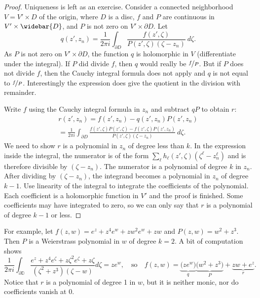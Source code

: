 \documentclass[12pt,openany]{book}
\newcommand{\D}{{\mathbb{D}}}
\theoremstyle{plain}
\theoremstyle{remark}
\theoremstyle{definition}
\theoremstyle{exercise}
\theoremstyle{example}
\begin{document}
\begin{proof}
Uniqueness is left as an exercise.  Consider
a connected neighborhood $V = V' \times D$ of the origin, where
$D$ is a disc,
$f$ and $P$ are continuous in $V' \times \widebar{D}$,
and $P$ is not zero on $V' \times \partial D$.
Let
\begin{equation*}
q(z',z_n) =
\frac{1}{2\pi i} \int_{\partial D} \frac{f(z',\zeta)}{P(z',\zeta)(\zeta-z_n)}
~d\zeta .
\end{equation*}
As $P$ is not zero on $V' \times \partial D$,
the function $q$
is holomorphic in $V$ (differentiate under the integral).
If $P$ did divide $f$, then $q$ would really be $\nicefrac{f}{P}$.
But if $P$ does not divide $f$, then
the Cauchy integral formula does not apply and $q$ is not equal to
$\nicefrac{f}{P}$.  Interestingly
the expression does give the quotient in the division with remainder.

Write $f$ using the Cauchy integral formula in $z_n$ and
subtract $qP$ to obtain $r$:
\begin{multline*}
r(z',z_n) = f(z',z_n) - q(z',z_n)P(z',z_n)
\\
=
\frac{1}{2\pi i}
\int_{\partial D} \frac{f(z',\zeta)P(z',\zeta) - f(z',\zeta)P(z',z_n)}{P(z',\zeta)(\zeta-z_n)}
~d\zeta .
\end{multline*}
We need to show $r$ is a polynomial in $z_n$ of degree less than
$k$.  In the expression inside the integral, the numerator is
of the form $\sum_\ell h_\ell(z',\zeta)(\zeta^\ell-z_n^\ell)$ and is therefore
divisible by $(\zeta-z_n)$.
The numerator is a polynomial of degree $k$ in
$z_n$.  After dividing by $(\zeta-z_n)$,
the integrand becomes
a polynomial in $z_n$ of degree $k-1$.
Use linearity of the integral
to integrate the coefficients of the polynomial.  Each coefficient is a
holomorphic function in $V'$ and the proof is finished.  Some coefficients may have
integrated to zero, so we can only say that $r$ is a polynomial
of degree $k-1$ or less.
\end{proof}

For example, let $f(z,w) = e^z + z^4 e^w + z w^2 e^w + zw$ and $P(z,w)
= w^2 + z^3$.  Then $P$ is a Weierstrass polynomial in $w$ of degree $k=2$.  A bit
of computation shows
\begin{equation*}
\frac{1}{2\pi i}
\int_{\partial \D}
\frac{e^z + z^4 e^{\zeta} + z {\zeta}^2 e^{\zeta} + z \zeta}{(\zeta^2+z^3)(\zeta-w)}
d\zeta
=
z e^w
,
\quad \text{so} \quad
f(z,w) = \underbrace{\bigl( ze^w \bigr)}_{q} \underbrace{\bigl( w^2 + z^3 \bigr)}_{P} +
\underbrace{z w + e^z}_{r} .
\end{equation*}
Notice that $r$ is a polynomial of degree 1 in $w$, but it is neither monic,
nor do coefficients vanish at 0.
\end{document}
